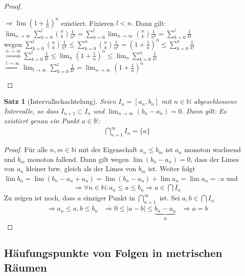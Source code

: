\documentclass[ngerman,titlepage,twoside, parskip=half*]{scrreprt}
\newcommand*{\N}{\mathbb{N}}
\newcommand*{\R}{\mathbb{R}}
\theoremstyle{plain}
\newtheorem{theorem}{Satz}[section]
\theoremstyle{definition}
\theoremstyle{remark}
\newcommand*{\abs}[2][]{#1\lvert#2#1\rvert}
\begin{document}
\begin{proof}
\begin{enumerate}
    $\Rightarrow \lim \left(1+\frac{1}{n}\right)^n$ existiert. Fixieren $l<n$.
    Dann gilt:\\
    $\lim_{n \rightarrow \infty} \sum_{k=0}^l \binom{n}{k} \frac{1}{n^k}
    = \sum_{k=0}^l \lim_{n \rightarrow \infty} \binom{n}{k} \frac{1}{n^k} = 
    \sum_{k=0}^l \frac{1}{k!}$\\
    wegen $\sum_{k=0}^l \binom{n}{k} \frac{1}{n^k}
    \leq \sum_{k=0}^n \binom{n}{k} \frac{1}{n^k}=\left( 1+\frac{1}{n}\right)^n
    \leq \sum_{k=0}^n \frac{1}{k!}$\\
    $\overset{n \rightarrow \infty}{\Rightarrow}\sum_{k=0}^l \frac{1}{k!} \leq
    \lim_n \left(1+\frac{1}{n}\right)^n \leq \lim_n \sum_{k=0}^n \frac{1}{k!}$\\
    $\overset{l \rightarrow \infty}{\Rightarrow} \lim_{l \rightarrow \infty}
    \sum_{k=0}^l \frac{1}{k!} = \lim_{n \rightarrow \infty} \left(1+\frac{1}{n}
    \right)^n$
\end{enumerate}
\end{proof}

\begin{theorem}[Intervallschachtelung]
  \label{satz:Ischachtelung}
  Seien $I_n=[a_n,b_n]$ mit $n \in \N$ abgeschlossene Intervalle, so
  dass $I_{n+1} \subset I_n$ und $\lim_{n \rightarrow \infty}
  (b_n-a_n)=0$. Dann gilt: Es existiert genau ein Punkt $a \in \R$:
  \begin{gather*}\bigcap_{n=1}^{\infty} I_n = \{a\}\end{gather*}
\end{theorem}
\begin{proof}
  Für alle $n,m \in \N$ mit der Eigenschaft $a_n \leq b_m$ ist $a_n $
  monoton wachsend und $b_m$ monoton fallend. Dann gilt wegen $\lim
  (b_n-a_n)=0$, dass der Limes von $a_n$ kleiner bzw. gleich als der
  Limes von $b_m$ ist. Weiter folgt $\lim b_n = \lim
  (b_n-a_n+a_n)=\lim(b_n-a_n)+\lim a_n=\lim a_n=:a$ und
  \begin{gather*}\Rightarrow \forall n \in \N \colon a_n \leq a \leq b_n \Rightarrow a \in
  \bigcap I_n\end{gather*}
  Zu zeigen ist noch, dass $a$ einziger Punkt in
  $\bigcap_{n=1}^\infty$ ist. Sei $a,b \in \bigcap I_n$
\begin{align*}
  \Rightarrow a_n \leq a,b \leq b_n & \Rightarrow 0 \leq \abs{a-b} \leq
  \underbrace{b_n-a_n}_{0} & \Rightarrow a = b
\end{align*}
\end{proof}

\subsection{Häufungspunkte von Folgen in metrischen Räumen}
\end{document}
